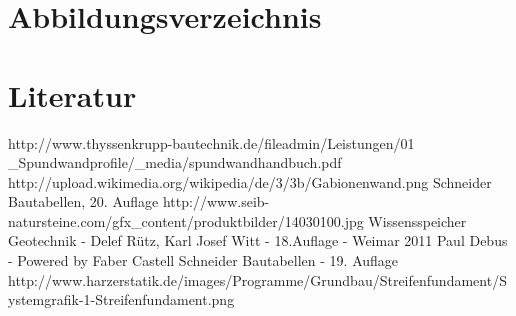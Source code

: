 \documentclass[11pt,fleqn,a4paper,halfparskip]{article}
\begin{document}
\newpage
\section{Abbildungsverzeichnis}
\listoffigures
\newpage
\section{Literatur}
\begin{thebibliography}{9}
http://www.thyssenkrupp-bautechnik.de/fileadmin/Leistungen/01 \_Spundwandprofile/\_media/spundwandhandbuch.pdf
 http://upload.wikimedia.org/wikipedia/de/3/3b/Gabionenwand.png
 Schneider Bautabellen, 20. Auflage
 http://www.seib-natursteine.com/gfx\_content/produktbilder/14030100.jpg
 Wissensspeicher Geotechnik - Delef Rütz, Karl Josef Witt - 18.Auflage - Weimar 2011
 Paul Debus - Powered by Faber Castell
 Schneider Bautabellen - 19. Auflage
 http://www.harzerstatik.de/images/Programme/Grundbau/Streifenfundament/Systemgrafik-1-Streifenfundament.png
\end{thebibliography}
\end{document}
